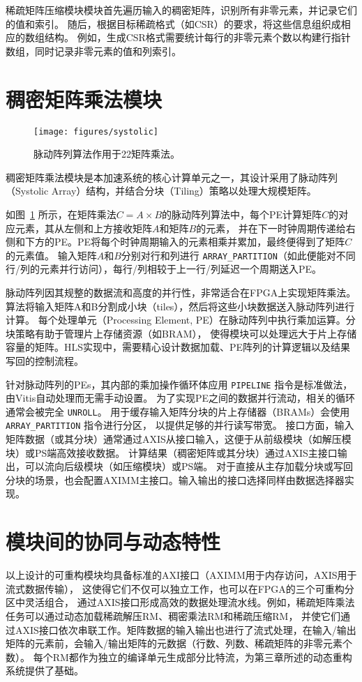 稀疏矩阵压缩模块模块首先遍历输入的稠密矩阵，识别所有非零元素，并记录它们的值和索引。
随后，根据目标稀疏格式（如CSR）的要求，将这些信息组织成相应的数组结构。
例如，生成CSR格式需要统计每行的非零元素个数以构建行指针数组，同时记录非零元素的值和列索引。

\section{稠密矩阵乘法模块}

\begin{figure}[htbp]
\centerline{\texttt{[image: figures/systolic]}}
\caption{脉动阵列算法作用于2\texttimes{}2矩阵乘法。}
\label{fig:systolic}
\end{figure}

稠密矩阵乘法模块是本加速系统的核心计算单元之一，其设计采用了脉动阵列（Systolic Array）结构，并结合分块（Tiling）策略以处理大规模矩阵。

如图~\ref{fig:systolic} 所示，在矩阵乘法\(C=A\times B\)的脉动阵列算法中，每个PE计算矩阵\(C\)的对应元素，其从左侧和上方接收矩阵\(A\)和矩阵\(B\)的元素，
并在下一时钟周期传递给右侧和下方的PE。PE将每个时钟周期输入的元素相乘并累加，最终便得到了矩阵\(C\)的元素值。
输入矩阵\(A\)和\(B\)分别对行和列进行 \verb|ARRAY_PARTITION|（如此便能对不同行/列的元素并行访问），每行/列相较于上一行/列延迟一个周期送入PE。

脉动阵列因其规整的数据流和高度的并行性，非常适合在FPGA上实现矩阵乘法。
算法将输入矩阵A和B分割成小块（tiles），然后将这些小块数据送入脉动阵列进行计算。
每个处理单元（Processing Element, PE）在脉动阵列中执行乘加运算。分块策略有助于管理片上存储资源（如BRAM），
使得模块可以处理远大于片上存储容量的矩阵。HLS实现中，需要精心设计数据加载、PE阵列的计算逻辑以及结果写回的控制流程。

针对脉动阵列的PEs，其内部的乘加操作循环体应用 \verb|PIPELINE| 指令是标准做法，由Vitis自动处理而无需手动设置。
为了实现PE之间的数据并行流动，相关的循环通常会被完全 \verb|UNROLL|。
用于缓存输入矩阵分块的片上存储器（BRAMs）会使用 \verb|ARRAY_PARTITION| 指令进行分区，
以提供足够的并行读写带宽。
接口方面，输入矩阵数据（或其分块）通常通过AXIS从接口输入，这便于从前级模块（如解压模块）或PS端高效接收数据。
计算结果（稠密矩阵或其分块）通过AXIS主接口输出，可以流向后级模块（如压缩模块）或PS端。
对于直接从主存加载分块或写回分块的场景，也会配置AXIMM主接口。输入输出的接口选择同样由数据选择器实现。

\section{模块间的协同与动态特性}

以上设计的可重构模块均具备标准的AXI接口（AXIMM用于内存访问，AXIS用于流式数据传输），
这使得它们不仅可以独立工作，也可以在FPGA的三个可重构分区中灵活组合，
通过AXIS接口形成高效的数据处理流水线。例如，稀疏矩阵乘法任务可以通过动态加载稀疏解压RM、稠密乘法RM和稀疏压缩RM，
并使它们通过AXIS接口依次串联工作。矩阵数据的输入输出也进行了流式处理，在输入/输出矩阵的元素前，会输入/输出矩阵的元数据（行数、列数、稀疏矩阵的非零元素个数）。
每个RM都作为独立的编译单元生成部分比特流，为第三章所述的动态重构系统提供了基础。
